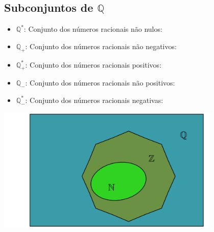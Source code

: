 \documentclass[10pt]{article}
\begin{document}
\subsection*{Subconjuntos de \( \mathbb{Q} \)}
\begin{multicols}{2}
    \begin{itemize}
        \item \( \mathbb{Q}^* \): Conjunto dos números racionais não nulos:
        \item \( \mathbb{Q}_+ \): Conjunto dos números racionais não negativos:
        \item \( \mathbb{Q}^*_+ \): Conjunto dos números racionais positivos:
        \item  \( \mathbb{Q}_- \): Conjunto dos números racionais não positivos:
        \item  \( \mathbb{Q}^*_- \): Conjunto dos números racionais negativas:
    \end{itemize}
\columnbreak
\bigskip
\noindent
    \begin{minipage}{\linewidth}
        \centering 
        \includegraphics[width=0.8\textwidth]{imgs/conjuntosNumerico/conjuntosRacionais.pdf}
        \label{fig:conjuntosRacionais} 
    \end{minipage}%
\end{multicols} 
\end{document}
